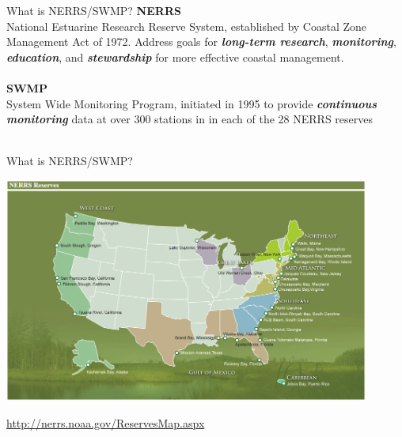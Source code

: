 \documentclass[serif]{beamer}\usepackage[]{graphicx}\usepackage[]{color}
\newcommand{\Bigtxt}[1]{\textbf{\textit{#1}}}
\begin{document}
\begin{frame}{What is NERRS/SWMP?}{}
{\bf NERRS}\\
National Estuarine Research Reserve System, established by Coastal Zone Management Act of 1972.  Address goals for \Bigtxt{long-term research}, \Bigtxt{monitoring}, \Bigtxt{education}, and \Bigtxt{stewardship} for more effective coastal management.\\~\\
{\bf SWMP}\\
System Wide Monitoring Program, initiated in 1995 to provide \Bigtxt{continuous monitoring} data at over 300 stations in in each of the 28 NERRS reserves \\~\\
\end{frame}

\begin{frame}{What is NERRS/SWMP?}
\centerline{\includegraphics[width = 0.9\textwidth]{fig/NERRS_locations.png}}
\tiny
\flushright
\href{http://nerrs.noaa.gov/ReservesMap.aspx}{http://nerrs.noaa.gov/ReservesMap.aspx}
\end{frame}
\end{document}

